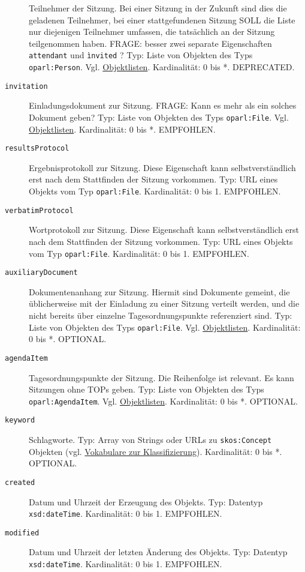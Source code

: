 \documentclass[,a4paper]{article}
\begin{document}
\begin{description}
Teilnehmer der Sitzung. Bei einer Sitzung in der Zukunft sind dies die
geladenen Teilnehmer, bei einer stattgefundenen Sitzung SOLL die Liste
nur diejenigen Teilnehmer umfassen, die tatsächlich an der Sitzung
teilgenommen haben. FRAGE: besser zwei separate Eigenschaften
\texttt{attendant} und \texttt{ìnvited} ? Typ: Liste von Objekten des
Typs \texttt{oparl:Person}. Vgl. \hyperref[objektlisten]{Objektlisten}.
Kardinalität: 0 bis *. DEPRECATED.
\item[\texttt{invitation}]
Einladungsdokument zur Sitzung. FRAGE: Kann es mehr als ein solches
Dokument geben? Typ: Liste von Objekten des Typs \texttt{oparl:File}.
Vgl. \hyperref[objektlisten]{Objektlisten}. Kardinalität: 0 bis *.
EMPFOHLEN.
\item[\texttt{resultsProtocol}]
Ergebnisprotokoll zur Sitzung. Diese Eigenschaft kann selbstverständlich
erst nach dem Stattfinden der Sitzung vorkommen. Typ: URL eines Objekts
vom Typ \texttt{oparl:File}. Kardinalität: 0 bis 1. EMPFOHLEN.
\item[\texttt{verbatimProtocol}]
Wortprotokoll zur Sitzung. Diese Eigenschaft kann selbstverständlich
erst nach dem Stattfinden der Sitzung vorkommen. Typ: URL eines Objekts
vom Typ \texttt{oparl:File}. Kardinalität: 0 bis 1. EMPFOHLEN.
\item[\texttt{auxiliaryDocument}]
Dokumentenanhang zur Sitzung. Hiermit sind Dokumente gemeint, die
üblicherweise mit der Einladung zu einer Sitzung verteilt werden, und
die nicht bereits über einzelne Tagesordnungspunkte referenziert sind.
Typ: Liste von Objekten des Typs \texttt{oparl:File}. Vgl.
\hyperref[objektlisten]{Objektlisten}. Kardinalität: 0 bis *. OPTIONAL.
\item[\texttt{agendaItem}]
Tagesordnungspunkte der Sitzung. Die Reihenfolge ist relevant. Es kann
Sitzungen ohne TOPs geben. Typ: Liste von Objekten des Typs
\texttt{oparl:AgendaItem}. Vgl. \hyperref[objektlisten]{Objektlisten}.
Kardinalität: 0 bis *. OPTIONAL.
\item[\texttt{keyword}]
Schlagworte. Typ: Array von Strings oder URLs zu \texttt{skos:Concept}
Objekten (vgl. \hyperref[vokabulareux5fklassifizierung]{Vokabulare zur
Klassifizierung}). Kardinalität: 0 bis *. OPTIONAL.
\item[\texttt{created}]
Datum und Uhrzeit der Erzeugung des Objekts. Typ: Datentyp
\texttt{xsd:dateTime}. Kardinalität: 0 bis 1. EMPFOHLEN.
\item[\texttt{modified}]
Datum und Uhrzeit der letzten Änderung des Objekts. Typ: Datentyp
\texttt{xsd:dateTime}. Kardinalität: 0 bis 1. EMPFOHLEN.
\end{description}
\end{document}
